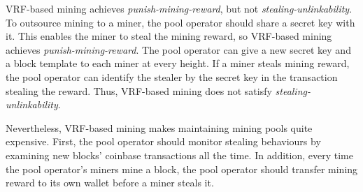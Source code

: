 VRF-based mining achieves \emph{punish-mining-reward}, but not \emph{stealing-unlinkability}.
To outsource mining to a miner, the pool operator should share a secret key with it.
This enables the miner to steal the mining reward, so VRF-based mining achieves \emph{punish-mining-reward}.
The pool operator can give a new secret key and a block template to each miner at every height.
If a miner steals mining reward, the pool operator can identify the stealer by the secret key in the transaction stealing the reward.
Thus, VRF-based mining does not satisfy \emph{stealing-unlinkability}.

Nevertheless, VRF-based mining makes maintaining mining pools quite expensive.
First, the pool operator should monitor stealing behaviours by examining new blocks' coinbase transactions all the time.
In addition, every time the pool operator's miners mine a block, the pool operator should transfer mining reward to its own wallet before a miner steals it.